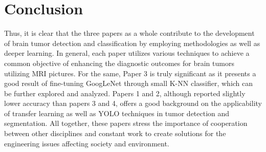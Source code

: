 \documentclass[a4paper,12pt]{extarticle}
\begin{document}
\section{Conclusion}
Thus, it is clear that the three papers as a whole contribute to the development of brain tumor detection and classification by employing methodologies as well as deeper learning. In general, each paper utilizes various techniques to achieve a common objective of enhancing the diagnostic outcomes for brain tumors utilizing MRI pictures. For the same, Paper 3 is truly significant as it presents a good result of fine-tuning GoogLeNet through small K-NN classifier, which can be further explored and analyzed. Papers 1 and 2, although reported slightly lower accuracy than papers 3 and 4, offers a good background on the applicability of transfer learning as well as YOLO techniques in tumor detection and segmentation. All together, these papers stress the importance of cooperation between other disciplines and constant work to create solutions for the engineering issues affecting society and environment.

\pagebreak



\end{document}

